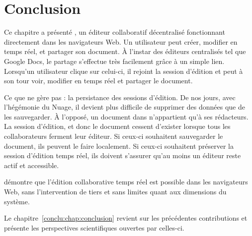 
\section{Conclusion}
\label{editor:sec:conclusion}

Ce chapitre a présenté \CRATE, un éditeur collaboratif décentralisé fonctionnant
directement dans les navigateurs Web. Un utilisateur peut créer, modifier en
temps réel, et partager son document. À l'instar des éditeurs centralisés tel
que Google Docs, le partage s'effectue très facilement grâce à un simple
lien. Lorsqu'un utilisateur clique sur celui-ci, il rejoint la session d'édition
et peut à son tour voir, modifier en temps réel et partager le document.

Ce que \CRATE ne gère pas : la persistance des sessions d'édition. De nos jours,
avec l'hégémonie du Nuage, il devient plus difficile de supprimer des données
que de les sauvegarder. À l'opposé, un document dans \CRATE n'appartient qu'à
ses rédacteurs. La session d'édition, et donc le document cessent d'exister
lorsque tous les collaborateurs ferment leur éditeur. Si ceux-ci souhaitent
sauvegarder le document, ils peuvent le faire localement. Si ceux-ci souhaitent
préserver la session d'édition temps réel, ils doivent s'assurer qu'au moins un
éditeur reste actif et accessible.


\CRATE démontre que l'édition collaborative temps réel est possible dans les
navigateurs Web, sans l'intervention de tiers et sans limites quant aux
dimensions du système.


Le chapitre~\ref{conclu:chap:conclusion} revient sur les précédentes
contributions et présente les perspectives scientifiques ouvertes par celles-ci.

